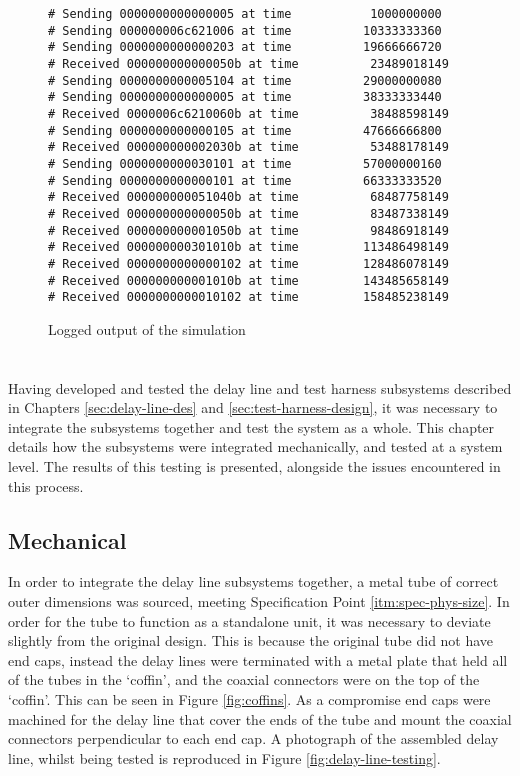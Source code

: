 \begin{figure}[ht]
	\centering
	\begin{lstlisting}
# Sending 0000000000000005 at time           1000000000
# Sending 000000006c621006 at time          10333333360
# Sending 0000000000000203 at time          19666666720
# Received 000000000000050b at time          23489018149
# Sending 0000000000005104 at time          29000000080
# Sending 0000000000000005 at time          38333333440
# Received 0000006c6210060b at time          38488598149
# Sending 0000000000000105 at time          47666666800
# Received 000000000002030b at time          53488178149
# Sending 0000000000030101 at time          57000000160
# Sending 0000000000000101 at time          66333333520
# Received 000000000051040b at time          68487758149
# Received 000000000000050b at time          83487338149
# Received 000000000001050b at time          98486918149
# Received 000000000301010b at time         113486498149
# Received 0000000000000102 at time         128486078149
# Received 000000000001010b at time         143485658149
# Received 0000000000010102 at time         158485238149
	\end{lstlisting}
	\caption{Logged output of the simulation}
	\label{fig:harness-sim-log}
\end{figure}

\chapter{} \label{sec:sys-integration}
Having developed and tested the delay line and test harness subsystems described in Chapters \ref{sec:delay-line-des} and \ref{sec:test-harness-design}, it was necessary to integrate the subsystems together and test the system as a whole. This chapter details how the subsystems were integrated mechanically, and tested at a system level. The results of this testing is presented, alongside the issues encountered in this process.

\section{Mechanical}
In order to integrate the delay line subsystems together, a metal tube of correct outer dimensions was sourced, meeting Specification Point \ref{itm:spec-phys-size}. In order for the tube to function as a standalone unit, it was necessary to deviate slightly from the original design. This is because the original tube did not have end caps, instead the delay lines were terminated with a metal plate that held all of the tubes in the `coffin', and the coaxial connectors were on the top of the `coffin'. This can be seen in Figure \ref{fig:coffins}. As a compromise end caps were machined for the delay line that cover the ends of the tube and mount the coaxial connectors perpendicular to each end cap. A photograph of the assembled delay line, whilst being tested is reproduced in Figure \ref{fig:delay-line-testing}.

